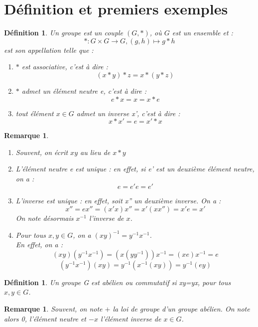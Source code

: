 \documentclass[a4paper, oneside]{report}
\theoremstyle{break}
\newtheorem{defi}[thm]{Définition}
\newtheorem{remar}[thm]{Remarque}
\newcommand{\x}{\times}
\begin{document}
\section{Définition et premiers exemples}

\begin{defi}
	Un groupe est un couple $(G,*)$, où $G$ est un ensemble et :
	$$*:G\x G \rightarrow G, (g,h)\mapsto g*h$$
	est son appellation telle que :
	\begin{enumerate}
		\item $*$ est associative, c'est à dire :
		$$(x*y)*z=x*(y*z)$$
		\item $*$ admet un élément neutre e, c'est à dire :
		$$e*x = x = x*e$$
		\item tout élément $x\in G$ admet un inverse x', c'est à dire :
		$$x*x'=e=x'*x$$
	\end{enumerate}	
\end{defi}

\begin{remar}
	\begin{enumerate}
		\item Souvent, on écrit $xy$ au lieu de $x*y$\\
		\item L'élément neutre e est unique : en effet, si e' est un deuxième élément neutre, on a :
		$$ e = e'e = e'$$
		\item L'inverse est unique : en effet, soit x'' un deuxième inverse. On a :
		$$x''=ex''=(x'x)x''=x'(xx'')=x'e=x'$$
		On note désormais $x^{-1}$ l'inverse de $x$.\\
		\item Pour tous $x,y\in G$, on a $(xy)^{-1}=y^{-1}x^{-1}$.\\
		En effet, on a :
		$$(xy)(y^{-1}x^{-1})=(x(yy^{-1}))x^{-1} = (xe)x^{-1}=e$$
		$$(y^{-1}x^{-1})(xy)=y^{-1}(x^{-1}(xy))=y^{-1}(ey)$$
	\end{enumerate}	
\end{remar}

\begin{defi}
	Un groupe G est abélien ou commutatif si xy=yx, pour tous $x,y\in G$.	
\end{defi}

\begin{remar}
	Souvent, on note $+$ la loi de groupe d'un groupe abélien. On note alors 0, l'élément neutre et $-x$ l'élément inverse de $x\in G$.	
\end{remar}
\end{document}
